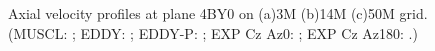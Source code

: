 \begin{figure}[t]
     \caption{Axial velocity profiles at plane 4BY0 on (a)3M (b)14M (c)50M grid. (MUSCL: \mline; EDDY: \eline; EDDY-P: \epline; EXP Cz Az0: \bluediam; EXP Cz Az180: \reddiam.)}
     \label{w} 
\end{figure}
